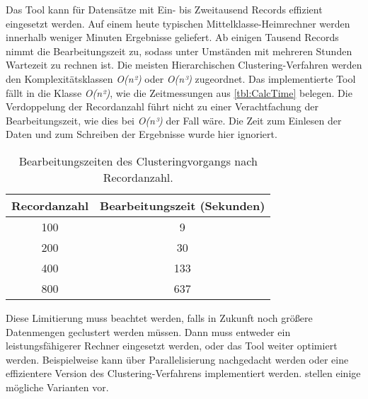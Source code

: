 Das Tool kann für Datensätze mit Ein- bis Zweitausend Records effizient eingesetzt werden.
Auf einem heute typischen Mittelklasse-Heimrechner werden innerhalb weniger Minuten Ergebnisse geliefert.
Ab einigen Tausend Records nimmt die Bearbeitungszeit zu,
sodass unter Umständen mit mehreren Stunden Wartezeit zu rechnen ist.
Die meisten Hierarchischen Clustering-Verfahren werden den Komplexitätsklassen
\emph{O(n²)} oder \emph{O(n³)} zugeordnet.
Das implementierte Tool fällt in die Klasse \emph{O(n²)},
wie die Zeitmessungen aus \autoref{tbl:CalcTime} belegen.
Die Verdoppelung der Recordanzahl führt nicht zu einer Verachtfachung der Bearbeitungszeit,
wie dies bei \emph{O(n³)} der Fall wäre.
Die Zeit zum Einlesen der Daten
und zum Schreiben der Ergebnisse wurde hier ignoriert.
\begin{table}[ht]
  \begin{center}
  \begin{tabular}{ |c|c| } 
   \hline
   Recordanzahl & Bearbeitungszeit (Sekunden) \\
   \hline \hline
   100 & 9 \\
   \hline
   200 & 30 \\
   \hline
   400 & 133 \\
   \hline
   800 & 637 \\
   \hline
  \end{tabular}
  \caption{Bearbeitungszeiten des Clusteringvorgangs nach Recordanzahl.}
  \label{tbl:CalcTime}
  \end{center}
\end{table}
Diese Limitierung muss beachtet werden,
falls in Zukunft noch größere Datenmengen geclustert werden müssen.
Dann muss entweder ein leistungsfähigerer Rechner eingesetzt werden,
oder das Tool weiter optimiert werden.
Beispielweise kann über Parallelisierung nachgedacht werden
oder eine effizientere Version des Clustering-Verfahrens implementiert werden.
\citet{patel_study_2015} stellen einige mögliche Varianten vor.

